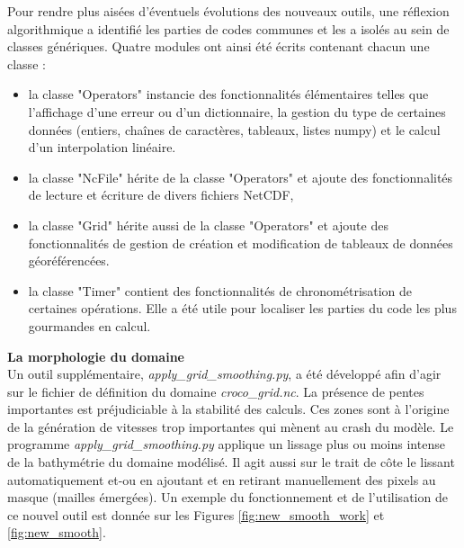\documentclass[10pt,a4paper,titlepage]{article}
\begin{document}
Pour rendre plus aisées d'éventuels évolutions des nouveaux outils, une réflexion algorithmique a identifié les parties de codes communes et les a isolés au sein de classes génériques.
Quatre modules ont ainsi été écrits contenant chacun une classe :
\begin{itemize}
    \item la classe "Operators" instancie des fonctionnalités élémentaires telles que l'affichage d'une erreur ou d'un dictionnaire, la gestion du type de certaines données (entiers, chaînes de caractères, tableaux, listes numpy) et le calcul d'un interpolation linéaire.
    \item la classe "NcFile" hérite de la classe "Operators" et ajoute des fonctionnalités de lecture et écriture de divers fichiers NetCDF,
    \item la classe "Grid" hérite aussi de la classe "Operators" et ajoute des fonctionnalités de gestion de création et modification de tableaux de données géoréférencées.
    \item la classe "Timer" contient des fonctionnalités de chronométrisation de certaines opérations.
    Elle a été utile pour localiser les parties du code les plus gourmandes en calcul.
\end{itemize}

\vspace*{0.5cm}
\textbf{La morphologie du domaine}\\
Un outil supplémentaire, \textit{apply\_grid\_smoothing.py}, a été développé afin d'agir sur le fichier de définition du domaine \textit{croco\_grid.nc}.
La présence de pentes importantes est préjudiciable à la stabilité des calculs.
Ces zones sont à l'origine de la génération de vitesses trop importantes qui mènent au crash du modèle.
Le programme \textit{apply\_grid\_smoothing.py} applique un lissage plus ou moins intense de la bathymétrie du domaine modélisé.
Il agit aussi sur le trait de côte le lissant automatiquement et-ou en ajoutant et en retirant manuellement des pixels au masque (mailles émergées).
Un exemple du fonctionnement et de l'utilisation de ce nouvel outil est donnée sur les Figures \ref{fig:new_smooth_work} et \ref{fig:new_smooth}.
\end{document}
